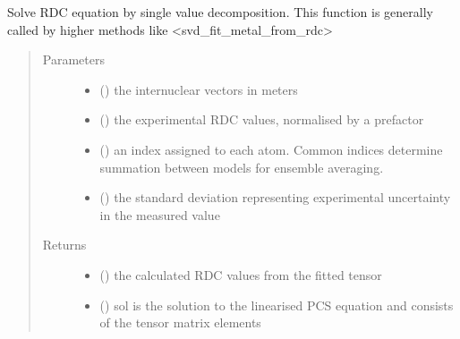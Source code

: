 \documentclass[a4paper,10pt,english]{sphinxmanual}
\begin{document}
\begin{fulllineitems}
\label{\detokenize{reference/generated/paramagpy.fit.svd_calc_metal_from_rdc:paramagpy.fit.svd_calc_metal_from_rdc}}
Solve RDC equation by single value decomposition.
This function is generally called by higher methods like
\textless{}svd\_fit\_metal\_from\_rdc\textgreater{}
\begin{quote}\begin{description}
\item[{Parameters}] \leavevmode\begin{itemize}
\item {} 
 (\sphinxstyleliteralemphasis{\sphinxupquote{ {[}}}\sphinxstyleliteralemphasis{\sphinxupquote{,}}\sphinxstyleliteralemphasis{\sphinxupquote{,}}\sphinxstyleliteralemphasis{\sphinxupquote{{]} }}) \textendash{} the internuclear vectors in meters

\item {} 
 () \textendash{} the experimental RDC values, normalised by a prefactor

\item {} 
 () \textendash{} an index assigned to each atom. Common indices determine summation
between models for ensemble averaging.

\item {} 
 () \textendash{} the standard deviation representing experimental uncertainty
in the measured value

\end{itemize}

\item[{Returns}] \leavevmode
\begin{itemize}
\item {} 
 () \textendash{} the calculated RDC values from the fitted tensor

\item {} 
 () \textendash{} sol is the solution to the linearised PCS equation and
consists of the tensor matrix elements

\end{itemize}


\end{description}\end{quote}

\end{fulllineitems}
\end{document}
